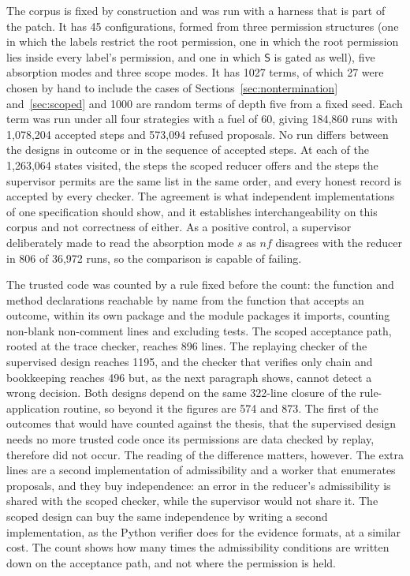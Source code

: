 \documentclass[11pt]{article}
\theoremstyle{definition}
\theoremstyle{remark}
\newcommand{\cS}{\mathsf{S}}
\begin{document}
The corpus is fixed by construction and was run with a harness that is part of the patch. It has 45 configurations, formed from three permission structures (one in which the labels restrict the root permission, one in which the root permission lies inside every label's permission, and one in which $\cS$ is gated as well), five absorption modes and three scope modes. It has 1027 terms, of which 27 were chosen by hand to include the cases of Sections~\ref{sec:nontermination} and~\ref{sec:scoped} and 1000 are random terms of depth five from a fixed seed. Each term was run under all four strategies with a fuel of 60, giving 184,860 runs with 1,078,204 accepted steps and 573,094 refused proposals. No run differs between the designs in outcome or in the sequence of accepted steps. At each of the 1,263,064 states visited, the steps the scoped reducer offers and the steps the supervisor permits are the same list in the same order, and every honest record is accepted by every checker. The agreement is what independent implementations of one specification should show, and it establishes interchangeability on this corpus and not correctness of either. As a positive control, a supervisor deliberately made to read the absorption mode $s$ as $nf$ disagrees with the reducer in 806 of 36,972 runs, so the comparison is capable of failing.

The trusted code was counted by a rule fixed before the count: the function and method declarations reachable by name from the function that accepts an outcome, within its own package and the module packages it imports, counting non-blank non-comment lines and excluding tests. The scoped acceptance path, rooted at the trace checker, reaches 896 lines. The replaying checker of the supervised design reaches 1195, and the checker that verifies only chain and bookkeeping reaches 496 but, as the next paragraph shows, cannot detect a wrong decision. Both designs depend on the same 322-line closure of the rule-application routine, so beyond it the figures are 574 and 873. The first of the outcomes that would have counted against the thesis, that the supervised design needs no more trusted code once its permissions are data checked by replay, therefore did not occur. The reading of the difference matters, however. The extra lines are a second implementation of admissibility and a worker that enumerates proposals, and they buy independence: an error in the reducer's admissibility is shared with the scoped checker, while the supervisor would not share it. The scoped design can buy the same independence by writing a second implementation, as the Python verifier does for the evidence formats, at a similar cost. The count shows how many times the admissibility conditions are written down on the acceptance path, and not where the permission is held.
\end{document}
